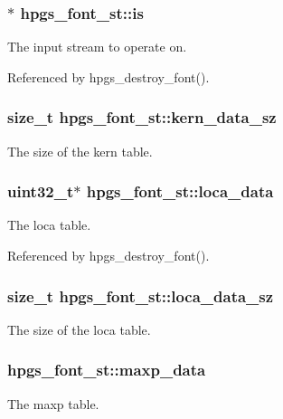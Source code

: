 \subsubsection[{is}]{$\ast$ {\bf hpgs\_\-font\_\-st::is}}\label{structhpgs__font__st_a778495b16d83becad5feea7c240e4b1a}
The input stream to operate on. 

Referenced by hpgs\_\-destroy\_\-font().

\subsubsection[{kern\_\-data\_\-sz}]{\setlength{\rightskip}{0pt plus 5cm}size\_\-t {\bf hpgs\_\-font\_\-st::kern\_\-data\_\-sz}}\label{structhpgs__font__st_afe5520a8a87fc7c612951a5a0bba86f3}
The size of the kern table. 
\subsubsection[{loca\_\-data}]{\setlength{\rightskip}{0pt plus 5cm}uint32\_\-t$\ast$ {\bf hpgs\_\-font\_\-st::loca\_\-data}}\label{structhpgs__font__st_acfa1cbe2a0f6c6b03fd04ceb088838d7}
The loca table. 

Referenced by hpgs\_\-destroy\_\-font().

\subsubsection[{loca\_\-data\_\-sz}]{\setlength{\rightskip}{0pt plus 5cm}size\_\-t {\bf hpgs\_\-font\_\-st::loca\_\-data\_\-sz}}\label{structhpgs__font__st_a96a6c25b2363f35b7debfa0eb30c6ce1}
The size of the loca table. 
\subsubsection[{maxp\_\-data}]{ {\bf hpgs\_\-font\_\-st::maxp\_\-data}}\label{structhpgs__font__st_a84b6da5894685a0b4f1732b6bfb96a9f}
The maxp table. 

